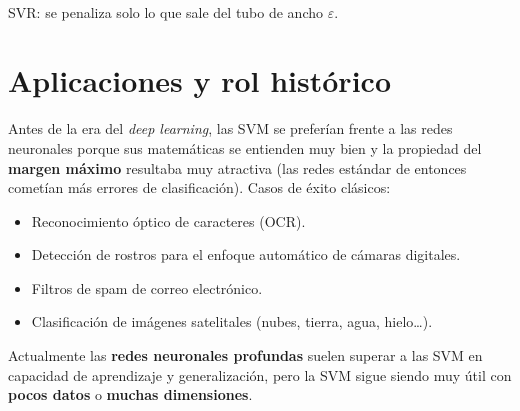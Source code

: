 \documentclass[11pt,a4paper]{article}
\begin{document}
\begin{center}
\\[2pt]
{\footnotesize SVR: se penaliza solo lo que sale del tubo de ancho $\varepsilon$.}
\end{center}

\section{Aplicaciones y rol histórico}
Antes de la era del \textit{deep learning}, las SVM se preferían frente a las redes neuronales
porque sus matemáticas se entienden muy bien y la propiedad del \textbf{margen máximo} resultaba
muy atractiva (las redes estándar de entonces cometían más errores de clasificación). Casos de
éxito clásicos:
\begin{itemize}[leftmargin=1.4em,nosep]
  \item Reconocimiento óptico de caracteres (OCR).
  \item Detección de rostros para el enfoque automático de cámaras digitales.
  \item Filtros de spam de correo electrónico.
  \item Clasificación de imágenes satelitales (nubes, tierra, agua, hielo\dots).
\end{itemize}
Actualmente las \textbf{redes neuronales profundas} suelen superar a las SVM en capacidad de
aprendizaje y generalización, pero la SVM sigue siendo muy útil con \textbf{pocos datos} o
\textbf{muchas dimensiones}.

\end{document}
